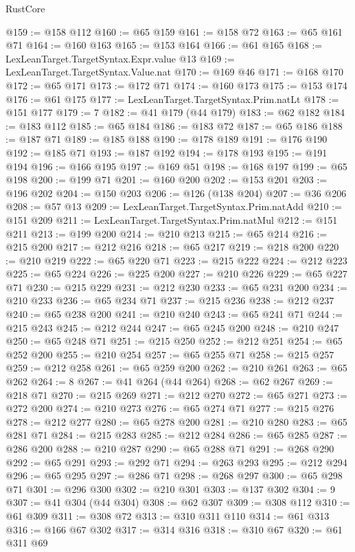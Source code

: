 \begin{lexlean}{RustCore}
\begin{coremodule}
@159 := @158 @112
@160 := @65 @159
@161 := @158 @72
@163 := @65 @161 @71
@164 := @160 @163
@165 := @153 @164
@166 := @61 @165
@168 := LexLeanTarget.TargetSyntax.Expr.value @13
@169 := LexLeanTarget.TargetSyntax.Value.nat
@170 := @169 @46
@171 := @168 @170
@172 := @65 @171
@173 := @172 @71
@174 := @160 @173
@175 := @153 @174
@176 := @61 @175
@177 := LexLeanTarget.TargetSyntax.Prim.natLt
@178 := @151 @177
@179 := 7
@182 := @41 @179 (@44 @179)
@183 := @62 @182
@184 := @183 @112
@185 := @65 @184
@186 := @183 @72
@187 := @65 @186
@188 := @187 @71
@189 := @185 @188
@190 := @178 @189
@191 := @176 @190
@192 := @185 @71
@193 := @187 @192
@194 := @178 @193
@195 := @191 @194
@196 := @166 @195
@197 := @169 @51
@198 := @168 @197
@199 := @65 @198
@200 := @199 @71
@201 := @160 @200
@202 := @153 @201
@203 := @196 @202
@204 := @150 @203
@206 := @126 (@138 @204)
@207 := @36 @206
@208 := @57 @13
@209 := LexLeanTarget.TargetSyntax.Prim.natAdd
@210 := @151 @209
@211 := LexLeanTarget.TargetSyntax.Prim.natMul
@212 := @151 @211
@213 := @199 @200
@214 := @210 @213
@215 := @65 @214
@216 := @215 @200
@217 := @212 @216
@218 := @65 @217
@219 := @218 @200
@220 := @210 @219
@222 := @65 @220 @71
@223 := @215 @222
@224 := @212 @223
@225 := @65 @224
@226 := @225 @200
@227 := @210 @226
@229 := @65 @227 @71
@230 := @215 @229
@231 := @212 @230
@233 := @65 @231 @200
@234 := @210 @233
@236 := @65 @234 @71
@237 := @215 @236
@238 := @212 @237
@240 := @65 @238 @200
@241 := @210 @240
@243 := @65 @241 @71
@244 := @215 @243
@245 := @212 @244
@247 := @65 @245 @200
@248 := @210 @247
@250 := @65 @248 @71
@251 := @215 @250
@252 := @212 @251
@254 := @65 @252 @200
@255 := @210 @254
@257 := @65 @255 @71
@258 := @215 @257
@259 := @212 @258
@261 := @65 @259 @200
@262 := @210 @261
@263 := @65 @262
@264 := 8
@267 := @41 @264 (@44 @264)
@268 := @62 @267
@269 := @218 @71
@270 := @215 @269
@271 := @212 @270
@272 := @65 @271
@273 := @272 @200
@274 := @210 @273
@276 := @65 @274 @71
@277 := @215 @276
@278 := @212 @277
@280 := @65 @278 @200
@281 := @210 @280
@283 := @65 @281 @71
@284 := @215 @283
@285 := @212 @284
@286 := @65 @285
@287 := @286 @200
@288 := @210 @287
@290 := @65 @288 @71
@291 := @268 @290
@292 := @65 @291
@293 := @292 @71
@294 := @263 @293
@295 := @212 @294
@296 := @65 @295
@297 := @286 @71
@298 := @268 @297
@300 := @65 @298 @71
@301 := @296 @300
@302 := @210 @301
@303 := @137 @302
@304 := 9
@307 := @41 @304 (@44 @304)
@308 := @62 @307
@309 := @308 @112
@310 := @61 @309
@311 := @308 @72
@313 := @310 @311 @110
@314 := @61 @313
@316 := @166 @67 @302
@317 := @314 @316
@318 := @310 @67
@320 := @61 @311 @69

\end{coremodule}
\end{lexlean}
